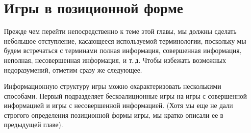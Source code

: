 \documentclass[12pt]{article}
\begin{document}
\newcommand{\be}{\begin{equation}}
\newcommand{\ee}{\end{equation}}
\renewcommand{\theequation}{\arabic{equation}}

\newcommand {\SC}{\succcurlyeq}
\newcommand {\GT}{\gtrsim}
\newcommand {\PR}{\precsim}
\newcommand {\UC}{\succsim}

\newcommand{\R}{{\rm I\!R}}
\newcommand{\B}{\hbox{\ms B}}
\newcommand{\Z}{\hbox{\ms Z}}

\newcommand{\bc}{\begin{center}}
\newcommand{\ec}{\end{center}}




\newtheorem{theorem}{Теорема}
\newtheorem{lemma}{Лемма}
\newtheorem{corollary}{Следствие}
\newtheorem{definition}{Определение}
\newtheorem{proposition}{Предложение}


\makeatletter
{}
\makeatother

\renewcommand{\thesection}{\arabic{section}.}






\section{Игры в позиционной форме }

Прежде чем перейти непосредственно к теме этой главы, мы должны
сделать небольшое отступление, касающееся используемой терминологии,
поскольку мы
будем встречаться с терминами полная информация, совершенная
информация, неполная, несовершенная информация, и т.\,д. Чтобы
избежать возможных недоразумений, отметим сразу же следующее.

Информационную структуру игры можно охарактеризовать несколькими
способами. Первый подразделяет бескоалиционные игры на игры с
совершенной информацией и игры с несовершенной информацией. (Хотя
мы еще не дали строгого определения позиционной формы игры, мы
кратко описали ее в предыдущей главе).
\end{document}

